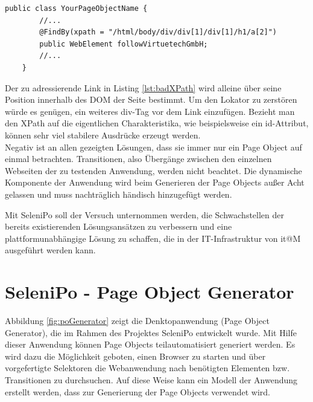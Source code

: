 \begin{lstlisting}[caption={Einfacher XPath-Lokator des Projektes OHMAP},label={lst:badXPath}]
	public class YourPageObjectName {
		//...		
 		@FindBy(xpath = "/html/body/div/div[1]/div[1]/h1/a[2]")
		public WebElement followVirtuetechGmbH;	
		//...
	}
\end{lstlisting}

Der zu adressierende Link in Listing \ref{lst:badXPath} wird alleine über seine Position innerhalb des DOM der Seite bestimmt.
Um den Lokator zu zerstören würde es genügen, ein weiteres div-Tag vor dem Link einzufügen. Bezieht man den XPath auf die eigentlichen Charakteristika, wie beispielsweise ein id-Attribut, können sehr viel stabilere Ausdrücke erzeugt werden.
\\
Negativ ist an allen gezeigten Lösungen, dass sie immer nur ein Page Object auf einmal betrachten. Transitionen, also Übergänge zwischen den einzelnen Webseiten der zu testenden Anwendung, werden nicht beachtet. Die dynamische Komponente der Anwendung wird beim Generieren der Page Objects außer Acht gelassen und muss nachträglich händisch hinzugefügt werden.

Mit SeleniPo soll der Versuch unternommen werden, die Schwachstellen der bereits existierenden Lösungsansätzen zu verbessern und eine plattformunabhängige Lösung zu schaffen, die in der IT-Infrastruktur von it@M ausgeführt werden kann.

\newpage
\section{SeleniPo - Page Object Generator}
\label{sec:selenipo_pogenerator}

Abbildung \ref{fig:poGenerator} zeigt die Denktopanwendung (Page Object Generator), die im Rahmen des Projektes SeleniPo entwickelt wurde. Mit Hilfe dieser Anwendung können Page Objects teilautomatisiert generiert werden. Es wird dazu die Möglichkeit geboten, einen Browser zu starten und über vorgefertigte Selektoren die Webanwendung nach benötigten Elementen bzw. Transitionen zu durchsuchen. Auf diese Weise kann ein Modell der Anwendung erstellt werden, dass zur Generierung der Page Objects verwendet wird.

